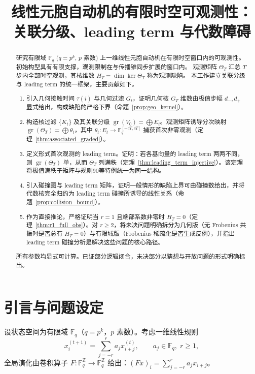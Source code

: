 \documentclass[11pt,a4paper]{ctexart}
\newcommand{\F}{\mathbb{F}}
\newcommand{\Z}{\mathbb{Z}}
\DeclareMathOperator{\gr}{gr}
\begin{document}
\title{线性元胞自动机的有限时空可观测性：\\
关联分级、leading term 与代数障碍}
\author{}
\date{}
\maketitle

\begin{abstract}
研究有限域 \(\F_q\) (\(q=p^k\), \(p\) 素数) 上一维线性元胞自动机在有限时空窗口内的可观测性。
初始构型具有有限支撑，观测限制在与传播锥同步扩展的窗口内。
观测矩阵 \(\Theta_T\) 汇总 \(T\) 步内全部时空观测，其核维数 \(H_T=\dim\ker\Theta_T\) 称为观测缺陷。
本工作建立关联分级与 leading term 的统一框架，主要贡献如下。
\begin{enumerate}[label=(\arabic*)]
    \item 引入几何接触时间 \(\tau(i)\) 与几何过滤 \(G_t\)，证明几何核 \(G_T\) 维数由极值步幅 \(d_-,d_+\) 显式给出，构成缺陷的严格下界（命题~\ref{prop:geo_kernel}）。
    \item 构造核过滤 \(\{K_t\}\) 及其关联分级 \(\gr(V_0)=\bigoplus E_t\)。观测矩阵诱导分次映射 \(\gr(\Theta_T)=\bigoplus\theta_t\)，其中 \(\theta_t:E_t\to\F_q^{[-cT,cT]}\) 捕获首次非零观测（定理~\ref{thm:associated_graded}）。
    \item 定义形式首次观测的 leading term。证明：若各基向量的 leading term 两两不同，则 \(\gr(\Theta_T)\) 单，从而 \(\Theta_T\) 列满秩（定理~\ref{thm:leading_term_injective}）。该定理将极值满秩子矩阵与规则90等特例统一为同一结构。
    \item 引入碰撞图与 leading term 矩阵，证明一般情形的缺陷上界可由碰撞数给出，并将代数核完全归约为 leading term 碰撞所诱导的线性关系（命题~\ref{prop:collision_bound}）。
    \item 作为直接推论，严格证明当 \(r=1\) 且端部系数非零时 \(H_T=0\)（定理~\ref{thm:r1_full_obs}）。对 \(r\ge2\)，将未决问题明确拆分为几何版（无 Frobenius 共振时是否总有 \(H_T=0\)）与有限域版（Frobenius 稀疏化是否生成反例），并指出 leading term 碰撞分析是解决这些问题的核心路径。
\end{enumerate}
所有参数均显式可计算。已证部分逻辑闭合，未决部分以猜想与开放问题的形式明确标出。
\end{abstract}

\section{引言与问题设定}
设状态空间为有限域 \(\F_q\)（\(q=p^k\)，\(p\) 素数）。考虑一维线性规则
\begin{equation}\label{eq:local_rule}
    x_i^{(t+1)} = \sum_{j=-r}^{r} a_j x_{i+j}^{(t)},\qquad a_j\in\F_q,\; r\ge 1,
\end{equation}
全局演化由卷积算子 \(F:\F_q^{\Z}\to\F_q^{\Z}\) 给出：\((F x)_i = \sum_{j=-r}^r a_j x_{i+j}\)。
\end{document}
